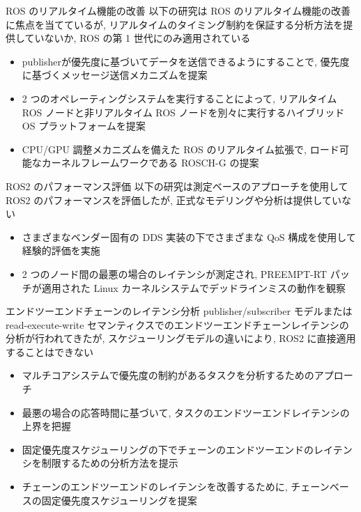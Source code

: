 \begin{frame}{ROS のリアルタイム機能の改善}
    以下の研究は ROS のリアルタイム機能の改善に焦点を当てているが, リアルタイムのタイミング制約を保証する分析方法を提供していないか, ROS の第 1 世代にのみ適用されている
    \begin{itemize}
        \item publisherが優先度に基づいてデータを送信できるようにすることで, 優先度に基づくメッセージ送信メカニズムを提案 \cite{saito2016priority}
        \item 2 つのオペレーティングシステムを実行することによって, リアルタイム ROS ノードと非リアルタイム ROS ノードを別々に実行するハイブリッド OS プラットフォームを提案 \cite{wei2016rt}
        \item CPU/GPU 調整メカニズムを備えた ROS のリアルタイム拡張で, ロード可能なカーネルフレームワークである ROSCH-G の提案 \cite{saito2018rosch}
    \end{itemize}
\end{frame}

\begin{frame}{ROS2 のパフォーマンス評価}
    以下の研究は測定ベースのアプローチを使用して ROS2 のパフォーマンスを評価したが, 正式なモデリングや分析は提供していない
    \begin{itemize}
        \item さまざまなベンダー固有の DDS 実装の下でさまざまな QoS 構成を使用して経験的評価を実施 \cite{maruyama2016exploring}
        \item 2 つのノード間の最悪の場合のレイテンシが測定され, PREEMPT-RT パッチが適用された Linux カーネルシステムでデッドラインミスの動作を観察 \cite{gutierrez2018towards}
    \end{itemize}
\end{frame}

\begin{frame}{エンドツーエンドチェーンのレイテンシ分析}
    publisher/subscriber モデルまたは read-execute-write セマンティクスでのエンドツーエンドチェーンレイテンシの分析が行われてきたが, スケジューリングモデルの違いにより, ROS2 に直接適用することはできない
    \setlength{\wideitemsep}{0.8\itemsep}
    {\footnotesize
        \begin{itemize}
            \item マルチコアシステムで優先度の制約があるタスクを分析するためのアプローチ \cite{palencia1998schedulability, palencia1999exploiting}
            \item 最悪の場合の応答時間に基づいて, タスクのエンドツーエンドレイテンシの上界を把握 \cite{davare2007period, schlatow2016response}
            \item 固定優先度スケジューリングの下でチェーンのエンドツーエンドのレイテンシを制限するための分析方法を提示 \cite{koren1995skip, abdullah2019worst, becker2016synthesizing}
            \item チェーンのエンドツーエンドのレイテンシを改善するために, チェーンベースの固定優先度スケジューリングを提案  \cite{choi2020chain}
        \end{itemize}
    }
\end{frame}

